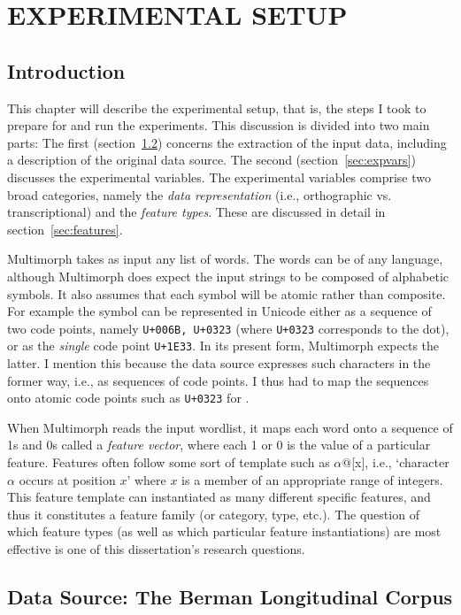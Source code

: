 \chapter{EXPERIMENTAL SETUP}
\label{ch:experi}
\section{Introduction}
This chapter will describe the experimental setup, that is, the steps I took to prepare for and run the experiments. This discussion
is divided into two main parts: The first (section~\ref{sec:datasource}) concerns the extraction of the input data, including a description of the original data source. The second (section~\ref{sec:expvars}) discusses the experimental variables. The experimental variables comprise two broad categories, namely the \emph{data representation} (i.e., orthographic vs. transcriptional) and the \emph{feature types}. These are discussed in detail in section~\ref{sec:features}. 

Multimorph takes as input any list of words. The words can be of any
language, although Multimorph does expect the input strings to be composed
of alphabetic symbols. It also assumes that each symbol will be atomic rather 
than composite. 
For example the symbol \textsf{} can be represented in Unicode either 
as a sequence of two code points, namely \texttt{U+006B, U+0323} 
(where \texttt{U+0323}
corresponds to the dot), or as the \emph{single} code point \texttt{U+1E33}. 
In its present form, Multimorph 
expects the latter. I mention this because the data source 
expresses
such characters in the former way, i.e., as sequences of code points. I thus had
to map the sequences onto atomic code points such as \texttt{U+0323} 
for \textsf{}.

When Multimorph reads the input wordlist, 
it maps each word onto
a sequence of 1s and 0s called a \emph{feature vector}, 
where each 1 or 0 is the value of a
particular feature. 
Features often follow some sort of template such as $\alpha$@[x], i.e., `character $\alpha$ occurs at position $x$' where $x$ is a member of an appropriate range of integers. This feature template can instantiated as many different specific features, and thus it constitutes a feature family (or category, type, etc.). The question of which feature types (as well as which particular feature instantiations) are most effective is one of this dissertation's research questions. 

\section{Data Source: The Berman Longitudinal Corpus}
\label{sec:datasource}
